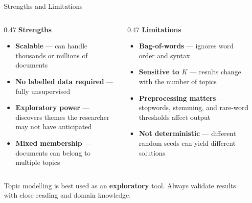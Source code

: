\documentclass[aspectratio=169]{beamer}
\begin{document}
\begin{frame}{Strengths and Limitations}
    \small
    \begin{columns}[T]
        \begin{column}{0.47\textwidth}
            \textbf{\color{sgsssGreen} Strengths}
            \begin{itemize}\setlength\itemsep{0pt}
                \item {} \textbf{Scalable} --- can handle thousands or millions of documents
                \item {} \textbf{No labelled data required} --- fully unsupervised
                \item {} \textbf{Exploratory power} --- discovers themes the researcher may not have anticipated
                \item {} \textbf{Mixed membership} --- documents can belong to multiple topics
            \end{itemize}
        \end{column}
        \begin{column}{0.47\textwidth}
            \textbf{\color{sgsssMagenta} Limitations}
            \begin{itemize}\setlength\itemsep{0pt}
                \item {} \textbf{Bag-of-words} --- ignores word order and syntax
                \item {} \textbf{Sensitive to \(K\)} --- results change with the number of topics
                \item {} \textbf{Preprocessing matters} --- stopwords, stemming, and rare-word thresholds affect output
                \item {} \textbf{Not deterministic} --- different random seeds can yield different solutions
            \end{itemize}
        \end{column}
    \end{columns}

    \vspace{0.3cm}
    {\small {} Topic modelling is best used as an \textbf{exploratory} tool. Always validate results with close reading and domain knowledge.}
\end{frame}
\end{document}
